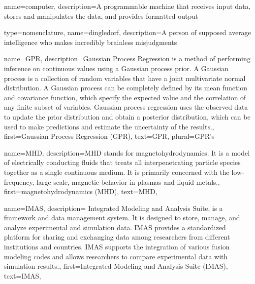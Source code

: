 {
name=computer,
description={A programmable machine that receives input data,
               stores and manipulates the data, and provides
               formatted output}
}

{
type=nomenclature,
name=dingledorf,
description={A person of supposed average intelligence who makes incredibly brainless misjudgments}
}



{%
  name={GPR},%
  description={Gaussian Process Regression is a method of performing inference on continuous values using a Gaussian process prior. A Gaussian process is a collection of random variables that have a joint multivariate normal distribution. A Gaussian process can be completely defined by its mean function and covariance function, which specify the expected value and the correlation of any finite subset of variables. Gaussian process regression uses the observed data to update the prior distribution and obtain a posterior distribution, which can be used to make predictions and estimate the uncertainty of the results.},
  first={Gaussian Process Regression (GPR)},%
  text={GPR},%
  plural={GPR's}%
}

{%
  name={MHD},%
  description={MHD stands for magnetohydrodynamics. It is a model of electrically conducting fluids that treats all interpenetrating particle species together as a single continuous medium. It is primarily concerned with the low-frequency, large-scale, magnetic behavior in plasmas and liquid metals.},
  first={magnetohydrodynamics (MHD)},%
  text={MHD},%
}

{%
  name={IMAS},%
  description={ Integrated Modeling and Analysis Suite, is a framework and data management system. It is designed to store, manage, and analyze experimental and simulation data. IMAS provides a standardized platform for sharing and exchanging data among researchers from different institutions and countries. IMAS supports the integration of various fusion modeling codes and allows researchers to compare experimental data with simulation results.},
  first={Integrated Modeling and Analysis Suite (IMAS)},%
  text={IMAS},%
}


